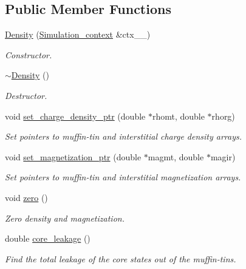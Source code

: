 \subsection*{Public Member Functions}
\begin{DoxyCompactItemize}
\item 
\hyperlink{classsirius_1_1_density_a7dca6937cc2b1e865f1d77edfc575906}{Density} (\hyperlink{classsirius_1_1_simulation__context}{Simulation\+\_\+context} \&ctx\+\_\+\+\_\+)
\begin{DoxyCompactList}\small\item\em Constructor. \end{DoxyCompactList}\item 
\hyperlink{classsirius_1_1_density_af35aa41caf09e4d41664f9551c424665}{$\sim$\+Density} ()
\begin{DoxyCompactList}\small\item\em Destructor. \end{DoxyCompactList}\item 
void \hyperlink{classsirius_1_1_density_acd0d1956e9bf3bfb28f62ae042a656fa}{set\+\_\+charge\+\_\+density\+\_\+ptr} (double $\ast$rhomt, double $\ast$rhorg)
\begin{DoxyCompactList}\small\item\em Set pointers to muffin-\/tin and interstitial charge density arrays. \end{DoxyCompactList}\item 
void \hyperlink{classsirius_1_1_density_aff03f6627c37979fbcfb24cdc6437fba}{set\+\_\+magnetization\+\_\+ptr} (double $\ast$magmt, double $\ast$magir)
\begin{DoxyCompactList}\small\item\em Set pointers to muffin-\/tin and interstitial magnetization arrays. \end{DoxyCompactList}\item 
void \hyperlink{classsirius_1_1_density_a2ffbfda23993b179d5994ef963db8602}{zero} ()
\begin{DoxyCompactList}\small\item\em Zero density and magnetization. \end{DoxyCompactList}\item 
double \hyperlink{classsirius_1_1_density_a34e844177d1e5a116dc27e5886ca1f58}{core\+\_\+leakage} ()
\begin{DoxyCompactList}\small\item\em Find the total leakage of the core states out of the muffin-\/tins. \end{DoxyCompactList}\item 

\end{DoxyCompactItemize}
